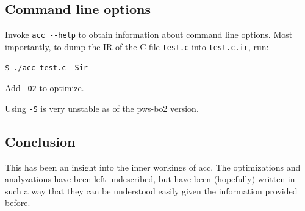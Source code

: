 \documentclass[12pt, a4paper]{article}
\begin{document}
\subsection{Command line options}
Invoke \verb+acc --help+ to obtain information about command line options. Most
importantly, to dump the IR of the C file \verb+test.c+ into \verb+test.c.ir+, run:

\begin{lstlisting}
$ ./acc test.c -Sir
\end{lstlisting}

Add \verb+-O2+ to optimize.

Using \verb+-S+ is very unstable as of the pws-bo2 version.

\subsection{Conclusion}
This has been an insight into the inner workings of acc. The optimizations
and analyzations have been left undescribed, but have been (hopefully) written
in such a way that they can be understood easily given the information provided
before.
\end{document}
